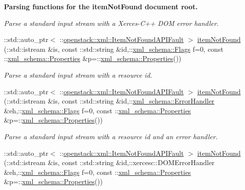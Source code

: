 \begin{Indent}{\bf Parsing functions for the itemNotFound document root.}
\begin{DoxyCompactItemize}
\begin{DoxyCompactList}\small\item\em Parse a standard input stream with a Xerces-\/C++ DOM error handler. \item\end{DoxyCompactList}\item 
::std::auto\_\-ptr$<$ ::\hyperlink{classopenstack_1_1xml_1_1ItemNotFoundAPIFault}{openstack::xml::ItemNotFoundAPIFault} $>$ \hyperlink{namespaceopenstack_1_1xml_acd3dfab0c58027c2d49c4efc2b51888f}{itemNotFound} (::std::istream \&is, const ::std::string \&id,::\hyperlink{namespacexml__schema_affb4c227cbd9aa7453dd1dc5a1401943}{xml\_\-schema::Flags} f=0, const ::\hyperlink{namespacexml__schema_ad27ce19a7ee1d3b1064092648898f64c}{xml\_\-schema::Properties} \&p=::\hyperlink{namespacexml__schema_ad27ce19a7ee1d3b1064092648898f64c}{xml\_\-schema::Properties}())
\begin{DoxyCompactList}\small\item\em Parse a standard input stream with a resource id. \item\end{DoxyCompactList}\item 
::std::auto\_\-ptr$<$ ::\hyperlink{classopenstack_1_1xml_1_1ItemNotFoundAPIFault}{openstack::xml::ItemNotFoundAPIFault} $>$ \hyperlink{namespaceopenstack_1_1xml_a8f9c58357d854b79f6dd8524df74f0ba}{itemNotFound} (::std::istream \&is, const ::std::string \&id,::\hyperlink{namespacexml__schema_ab1c9361bfd3b404eaabf0c31eded79dc}{xml\_\-schema::ErrorHandler} \&eh,::\hyperlink{namespacexml__schema_affb4c227cbd9aa7453dd1dc5a1401943}{xml\_\-schema::Flags} f=0, const ::\hyperlink{namespacexml__schema_ad27ce19a7ee1d3b1064092648898f64c}{xml\_\-schema::Properties} \&p=::\hyperlink{namespacexml__schema_ad27ce19a7ee1d3b1064092648898f64c}{xml\_\-schema::Properties}())
\begin{DoxyCompactList}\small\item\em Parse a standard input stream with a resource id and an error handler. \item\end{DoxyCompactList}\item 
::std::auto\_\-ptr$<$ ::\hyperlink{classopenstack_1_1xml_1_1ItemNotFoundAPIFault}{openstack::xml::ItemNotFoundAPIFault} $>$ \hyperlink{namespaceopenstack_1_1xml_a5d721a9db8e94b41ea022a00666b10ea}{itemNotFound} (::std::istream \&is, const ::std::string \&id,::xercesc::DOMErrorHandler \&eh,::\hyperlink{namespacexml__schema_affb4c227cbd9aa7453dd1dc5a1401943}{xml\_\-schema::Flags} f=0, const ::\hyperlink{namespacexml__schema_ad27ce19a7ee1d3b1064092648898f64c}{xml\_\-schema::Properties} \&p=::\hyperlink{namespacexml__schema_ad27ce19a7ee1d3b1064092648898f64c}{xml\_\-schema::Properties}())

\end{DoxyCompactItemize}
\end{Indent}
